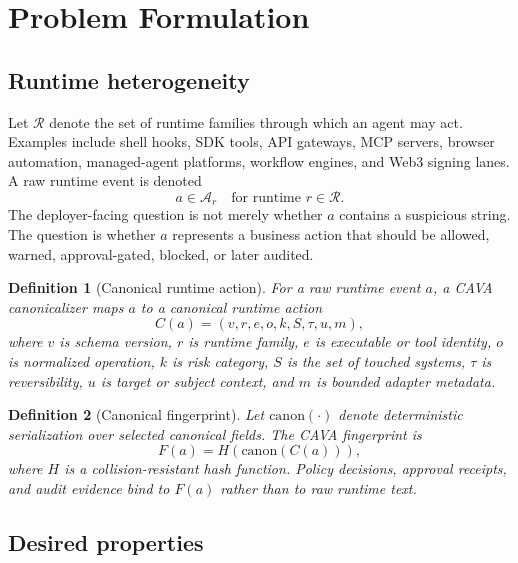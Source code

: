 \documentclass[11pt]{article}
\newtheorem{definition}{Definition}
\begin{document}
\section{Problem Formulation}

\subsection{Runtime heterogeneity}

Let $\mathcal{R}$ denote the set of runtime families through which an agent may act. Examples include shell hooks, SDK tools, API gateways, MCP servers, browser automation, managed-agent platforms, workflow engines, and Web3 signing lanes. A raw runtime event is denoted
\[
a \in \mathcal{A}_r \quad \text{for runtime } r \in \mathcal{R}.
\]
The deployer-facing question is not merely whether $a$ contains a suspicious string. The question is whether $a$ represents a business action that should be allowed, warned, approval-gated, blocked, or later audited.

\begin{definition}[Canonical runtime action]
For a raw runtime event $a$, a CAVA canonicalizer maps $a$ to a canonical runtime action
\[
C(a) = (v, r, e, o, k, S, \tau, u, m),
\]
where $v$ is schema version, $r$ is runtime family, $e$ is executable or tool identity, $o$ is normalized operation, $k$ is risk category, $S$ is the set of touched systems, $\tau$ is reversibility, $u$ is target or subject context, and $m$ is bounded adapter metadata.
\end{definition}

\begin{definition}[Canonical fingerprint]
Let $\mathrm{canon}(\cdot)$ denote deterministic serialization over selected canonical fields. The CAVA fingerprint is
\[
F(a) = H(\mathrm{canon}(C(a))),
\]
where $H$ is a collision-resistant hash function. Policy decisions, approval receipts, and audit evidence bind to $F(a)$ rather than to raw runtime text.
\end{definition}

\subsection{Desired properties}
\end{document}
